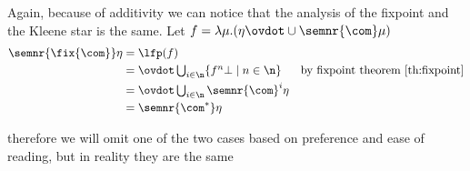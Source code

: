 Again, because of additivity we can notice that the analysis of the
fixpoint and the Kleene star is the same. Let
\(f = \lambda \mu . (\eta \ovdot\cup \semnr{\com}\mu)\)
\begin{align*}
  \semnr{\fix{\com}}\eta & = \lfp(f) \\
                         & = \textstyle\ovdot\bigcup_{i\in\n}\{f^n\bot \mid n \in \n\} & \text{by fixpoint theorem \ref{th:fixpoint}}\\
                         & = \textstyle\ovdot\bigcup_{i\in\n}\semnr{\com}^i\eta \\
                         & = \semnr{\com^*}\eta
\end{align*}

therefore we will omit one of the two cases based on preference and
ease of reading, but in reality they are the same
